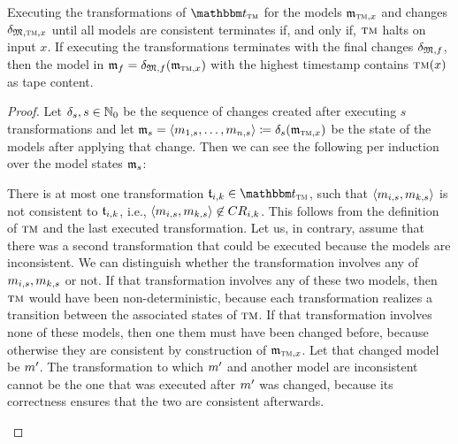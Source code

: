 \begin{lemma}
    \label{lemma:turing_machine_construction}
    Executing the transformations of $\transformationset{T}_{\TuringMachine}$ for the models $\modeltuple{m}_{\TuringMachine,x}$ and changes $\changetuple{\metamodeltuple{M},\TuringMachine,x}$ until all models are consistent %
    terminates if, and only if, $\textsc{tm}$ halts on input $x$.
	If executing the transformations terminates with the final changes $\changetuple{\metamodeltuple{M},f}$, then the model in $\modeltuple{m}_{f} = \changetuple{\metamodeltuple{M},f}(\modeltuple{m}_{\TuringMachine,x})$ with the highest timestamp contains $\textsc{tm}(x)$ as tape content.
\end{lemma}
\begin{proof}
    Let $\mathfrak{\delta}_{s}, s \in \mathbb{N}_0$ be the sequence of changes created after executing $s$ transformations and let $\modeltuple{m}_{s} = \tupled{\model{m}{1,s}, \dots, \model{m}{n,s}}\equalsperdefinition \changetuple{s}(\modeltuple{m}_{\TuringMachine,x})$ be the state of the models after applying that change.
    Then we can see the following per induction over the model states $\modeltuple{m}_{s}$:
	\begin{longenumerate} %
        \item 
            There is at most one transformation $\transformation{t}_{i,k} \in \transformationset{T}_{\TuringMachine}$, such that $\tupled{\model{m}{i,s},\model{m}{k,s}}$ is not consistent to $\transformation{t}_{i,k}$, i.e., $\tupled{\model{m}{i,s},\model{m}{k,s}} \not\in \consistencyrelation{CR}{i,k}$.
            This follows from the definition of $\textsc{tm}$ and the last executed transformation.
            Let us, in contrary, assume that there was a second transformation that could be executed because the models are inconsistent. 
            We can distinguish whether the transformation involves any of $\model{m}{i,s},\model{m}{k,s}$ or not.
            If that transformation involves any of these two models, then $\textsc{tm}$ would have been non-deterministic, because each transformation realizes a transition between the associated states of $\textsc{tm}$.
            If that transformation involves none of these models, then one them must have been changed before, because otherwise they are consistent by construction of $\modeltuple{m}_{\TuringMachine,x}$.
            Let that changed model be $\model{m}{}'$.
            The transformation to which $\model{m}{}'$ and another model are inconsistent cannot be the one that was executed after $\model{m}{}'$ was changed, because its correctness ensures that the two are consistent afterwards.

\end{longenumerate}
\end{proof}
